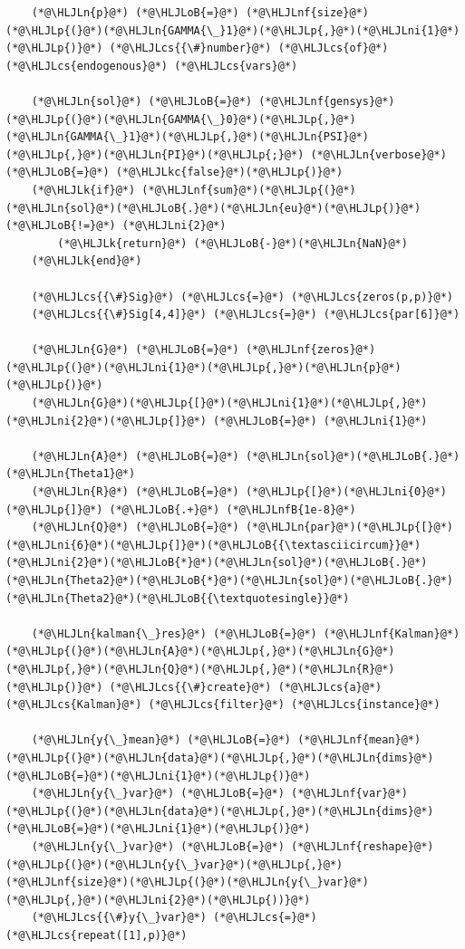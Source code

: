 \documentclass[12pt,a4paper]{article}
\newcommand{\HLJLk}[1]{\textcolor[RGB]{148,91,176}{\textbf{#1}}}
\newcommand{\HLJLkc}[1]{\textcolor[RGB]{59,151,46}{\textit{#1}}}
\newcommand{\HLJLn}[1]{#1}
\newcommand{\HLJLnf}[1]{\textcolor[RGB]{66,102,213}{#1}}
\newcommand{\HLJLnfB}[1]{\textcolor[RGB]{59,151,46}{#1}}
\newcommand{\HLJLni}[1]{\textcolor[RGB]{59,151,46}{#1}}
\newcommand{\HLJLoB}[1]{\textcolor[RGB]{102,102,102}{\textbf{#1}}}
\newcommand{\HLJLp}[1]{#1}
\newcommand{\HLJLcs}[1]{\textcolor[RGB]{153,153,119}{\textit{#1}}}
\begin{document}
\begin{lstlisting}
    (*@\HLJLn{p}@*) (*@\HLJLoB{=}@*) (*@\HLJLnf{size}@*)(*@\HLJLp{(}@*)(*@\HLJLn{GAMMA{\_}1}@*)(*@\HLJLp{,}@*)(*@\HLJLni{1}@*)(*@\HLJLp{)}@*) (*@\HLJLcs{{\#}number}@*) (*@\HLJLcs{of}@*) (*@\HLJLcs{endogenous}@*) (*@\HLJLcs{vars}@*)

    (*@\HLJLn{sol}@*) (*@\HLJLoB{=}@*) (*@\HLJLnf{gensys}@*)(*@\HLJLp{(}@*)(*@\HLJLn{GAMMA{\_}0}@*)(*@\HLJLp{,}@*)(*@\HLJLn{GAMMA{\_}1}@*)(*@\HLJLp{,}@*)(*@\HLJLn{PSI}@*)(*@\HLJLp{,}@*)(*@\HLJLn{PI}@*)(*@\HLJLp{;}@*) (*@\HLJLn{verbose}@*) (*@\HLJLoB{=}@*) (*@\HLJLkc{false}@*)(*@\HLJLp{)}@*)
    (*@\HLJLk{if}@*) (*@\HLJLnf{sum}@*)(*@\HLJLp{(}@*)(*@\HLJLn{sol}@*)(*@\HLJLoB{.}@*)(*@\HLJLn{eu}@*)(*@\HLJLp{)}@*) (*@\HLJLoB{!=}@*) (*@\HLJLni{2}@*)
        (*@\HLJLk{return}@*) (*@\HLJLoB{-}@*)(*@\HLJLn{NaN}@*)
    (*@\HLJLk{end}@*)

    (*@\HLJLcs{{\#}Sig}@*) (*@\HLJLcs{=}@*) (*@\HLJLcs{zeros(p,p)}@*)
    (*@\HLJLcs{{\#}Sig[4,4]}@*) (*@\HLJLcs{=}@*) (*@\HLJLcs{par[6]}@*)

    (*@\HLJLn{G}@*) (*@\HLJLoB{=}@*) (*@\HLJLnf{zeros}@*)(*@\HLJLp{(}@*)(*@\HLJLni{1}@*)(*@\HLJLp{,}@*)(*@\HLJLn{p}@*)(*@\HLJLp{)}@*)
    (*@\HLJLn{G}@*)(*@\HLJLp{[}@*)(*@\HLJLni{1}@*)(*@\HLJLp{,}@*)(*@\HLJLni{2}@*)(*@\HLJLp{]}@*) (*@\HLJLoB{=}@*) (*@\HLJLni{1}@*)

    (*@\HLJLn{A}@*) (*@\HLJLoB{=}@*) (*@\HLJLn{sol}@*)(*@\HLJLoB{.}@*)(*@\HLJLn{Theta1}@*)
    (*@\HLJLn{R}@*) (*@\HLJLoB{=}@*) (*@\HLJLp{[}@*)(*@\HLJLni{0}@*)(*@\HLJLp{]}@*) (*@\HLJLoB{.+}@*) (*@\HLJLnfB{1e-8}@*)
    (*@\HLJLn{Q}@*) (*@\HLJLoB{=}@*) (*@\HLJLn{par}@*)(*@\HLJLp{[}@*)(*@\HLJLni{6}@*)(*@\HLJLp{]}@*)(*@\HLJLoB{{\textasciicircum}}@*)(*@\HLJLni{2}@*)(*@\HLJLoB{*}@*)(*@\HLJLn{sol}@*)(*@\HLJLoB{.}@*)(*@\HLJLn{Theta2}@*)(*@\HLJLoB{*}@*)(*@\HLJLn{sol}@*)(*@\HLJLoB{.}@*)(*@\HLJLn{Theta2}@*)(*@\HLJLoB{{\textquotesingle}}@*)

    (*@\HLJLn{kalman{\_}res}@*) (*@\HLJLoB{=}@*) (*@\HLJLnf{Kalman}@*)(*@\HLJLp{(}@*)(*@\HLJLn{A}@*)(*@\HLJLp{,}@*)(*@\HLJLn{G}@*)(*@\HLJLp{,}@*)(*@\HLJLn{Q}@*)(*@\HLJLp{,}@*)(*@\HLJLn{R}@*)(*@\HLJLp{)}@*) (*@\HLJLcs{{\#}create}@*) (*@\HLJLcs{a}@*) (*@\HLJLcs{Kalman}@*) (*@\HLJLcs{filter}@*) (*@\HLJLcs{instance}@*)

    (*@\HLJLn{y{\_}mean}@*) (*@\HLJLoB{=}@*) (*@\HLJLnf{mean}@*)(*@\HLJLp{(}@*)(*@\HLJLn{data}@*)(*@\HLJLp{,}@*)(*@\HLJLn{dims}@*)(*@\HLJLoB{=}@*)(*@\HLJLni{1}@*)(*@\HLJLp{)}@*)
    (*@\HLJLn{y{\_}var}@*) (*@\HLJLoB{=}@*) (*@\HLJLnf{var}@*)(*@\HLJLp{(}@*)(*@\HLJLn{data}@*)(*@\HLJLp{,}@*)(*@\HLJLn{dims}@*)(*@\HLJLoB{=}@*)(*@\HLJLni{1}@*)(*@\HLJLp{)}@*)
    (*@\HLJLn{y{\_}var}@*) (*@\HLJLoB{=}@*) (*@\HLJLnf{reshape}@*)(*@\HLJLp{(}@*)(*@\HLJLn{y{\_}var}@*)(*@\HLJLp{,}@*)(*@\HLJLnf{size}@*)(*@\HLJLp{(}@*)(*@\HLJLn{y{\_}var}@*)(*@\HLJLp{,}@*)(*@\HLJLni{2}@*)(*@\HLJLp{))}@*)
    (*@\HLJLcs{{\#}y{\_}var}@*) (*@\HLJLcs{=}@*) (*@\HLJLcs{repeat([1],p)}@*)


\end{lstlisting}
\end{document}
